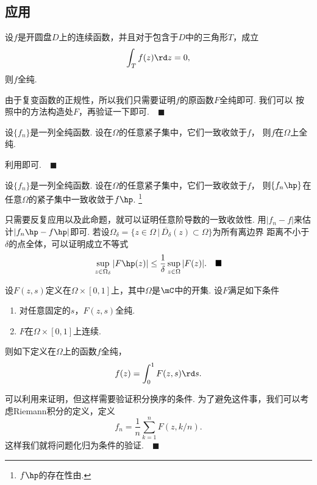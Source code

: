 \subsection{应用}

  \begin{thm}[Morera]
    \label{thm: Morera}
    设$f$是开圆盘$D$上的连续函数，并且对于包含于$D$中的三角形$T$，成立
    \[
      \int_T f(z)\rd z = 0,
    \]
    则$f$全纯.
  \end{thm}
  \proof
    由于复变函数的正规性，所以我们只需要证明$f$的原函数$F$全纯即可. 我们可以
    按照中的方法构造处$F$，再验证一下即可.$\quad\blacksquare$

  \begin{thm}[级数]
    \label{thm: 级数、全纯}
    设$\{f_n\}$是一列全纯函数. 设在$\Omega$的任意紧子集中，它们一致收敛于$f$，
    则$f$在$\Omega$上全纯.
  \end{thm}
  \proof
    利用即可.$\quad\blacksquare$

  \begin{thm}
    设$\{f_n\}$是一列全纯函数. 设在$\Omega$的任意紧子集中，它们一致收敛于$f$，
    则$\{f_n\hp\}$在任意$\Omega$的紧子集中一致收敛于$f\hp$.
    \footnote{$f\hp$的存在性由.}
  \end{thm}
  \remark
    只需要反复应用以及此命题，就可以证明任意阶导数的一致收敛性.
  \proof
    用$|f_n-f|$来估计$|f_n\hp-f\hp|$即可. 若设$\Omega_\delta=
    \{z\in\Omega\,|\, \overline{D_\delta}(z)\subset\Omega\}$为所有离边界
    距离不小于$\delta$的点全体，可以证明成立不等式
    \[
      \sup_{z\in\Omega_\delta}|F\hp(z)| \le \frac{1}{\delta}\sup_{z\in\Omega}|F(z)|.
      \quad\blacksquare
    \]

  \begin{thm}[含参积分]
    \label{thm: 含参积分、全纯}
    设$F(z,s)$定义在$\Omega\times[0, 1]$上，其中$\Omega$是$\mC$中的开集.
    设$F$满足如下条件
    \begin{enumerate}
      \item 对任意固定的$s$，$F(z, s)$全纯.
      \item $F$在$\Omega\times[0, 1]$上连续.
    \end{enumerate}
    则如下定义在$\Omega$上的函数$f$全纯，
    \[
      f(z) = \int_0^1F(z,s)\rd s.
    \]
  \end{thm}
  \proof
    可以利用来证明，但这样需要验证积分换序的条件.
    为了避免这件事，我们可以考虑Riemann积分的定义，定义
    \[
      f_n = \frac{1}{n}\sum_{k=1}^nF(z,k/n).
    \]
    这样我们就将问题化归为条件的验证.$\quad\blacksquare$

